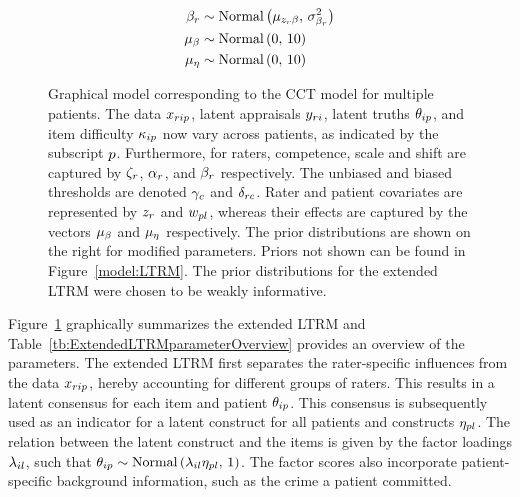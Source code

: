 \documentclass[a4paper,usenames,dvipsnames]{article}
\newenvironment{revision}{\color{black}}{\color{black}}
\begin{document}
\begin{figure}[!ht]
\begin{minipage}{0.4\textwidth}
{\begin{align*}
	\beta_r   					&\sim 	\text{Normal}\left(\mu_{z_r\beta},\,\sigma_{\beta_r}^2\right)\\
	\mu_{\beta}						&\sim 	\text{Normal}\left(0,\,10\right)																	\\
	\mu_{\eta}						&\sim 	\text{Normal}\left(0,\,10\right)
	\end{align*}
}%
\end{minipage}
	\caption{Graphical model corresponding to the CCT model for multiple patients. The data $x_{rip}$, latent appraisals $y_{ri}$, latent truths $\theta_{ip}$, and item difficulty $\kappa_{ip}$ now vary across patients, as indicated by the subscript $p$. Furthermore, for raters, competence, scale and shift are captured by $\zeta_r$, $\alpha_r$, and $\beta_r$ respectively. The unbiased and biased thresholds are denoted $\gamma_c$ and $\delta_{rc}$. Rater and patient covariates are represented by $z_r$ and $w_{pl}$, whereas their effects are captured by the vectors $\mu_{\beta}$ and $\mu_{\eta}$ respectively. The prior distributions are shown on the right for modified parameters. Priors not shown can be found in Figure~\ref{model:LTRM}. The prior distributions for the extended LTRM were chosen to be weakly informative.}
	\label{model:LTRM3}
\end{figure}

Figure~\ref{model:LTRM3} graphically summarizes the extended LTRM \protect\begin{revision}and Table~\ref{tb:ExtendedLTRMparameterOverview} provides an overview of the parameters\protect\end{revision}. The extended LTRM first separates the rater-specific influences from the data $x_{rip}$, hereby accounting for different groups of raters. This results in a latent consensus for each item and patient $\theta_{ip}$. This consensus is subsequently used as an indicator for a latent construct for all patients and constructs $\eta_{pl}$. The relation between the latent construct and the items is given by the factor loadings $\lambda_{il}$, such that $\theta_{ip} \sim \text{Normal}\left(\lambda_{il}\eta_{pl},\,1\right)$. The factor scores also incorporate patient-specific background information, such as the crime a patient committed.
\end{document}
